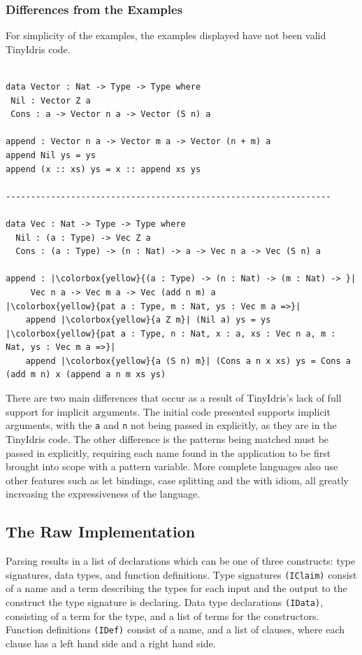 \documentclass[a4paper]{article}
\begin{document}
\clearpage

\subsubsection{Differences from the Examples}
\label{sec:orgcd8bb18}

For simplicity of the examples, the examples displayed have not been 
valid TinyIdris code. 

\begin{center}
\begin{verbatim}

data Vector : Nat -> Type -> Type where
 Nil : Vector Z a
 Cons : a -> Vector n a -> Vector (S n) a

append : Vector n a -> Vector m a -> Vector (n + m) a
append Nil ys = ys
append (x :: xs) ys = x :: append xs ys

-----------------------------------------------------------------

data Vec : Nat -> Type -> Type where
  Nil : (a : Type) -> Vec Z a
  Cons : (a : Type) -> (n : Nat) -> a -> Vec n a -> Vec (S n) a

append : |\colorbox{yellow}{(a : Type) -> (n : Nat) -> (m : Nat) -> }|
	 Vec n a -> Vec m a -> Vec (add n m) a
|\colorbox{yellow}{pat a : Type, m : Nat, ys : Vec m a =>}|
	append |\colorbox{yellow}{a Z m}| (Nil a) ys = ys
|\colorbox{yellow}{pat a : Type, n : Nat, x : a, xs : Vec n a, m : Nat, ys : Vec m a =>}|
	append |\colorbox{yellow}{a (S n) m}| (Cons a n x xs) ys = Cons a (add m n) x (append a n m xs ys)
\end{verbatim}
\end{center}

There are two main differences that occur as a result of TinyIdris's lack of full
support for implicit arguments. The initial code presented supports
implicit arguments, with the \texttt{a} and \texttt{n} not being passed in explicitly,
as they are in the TinyIdris code. The other difference is the patterns
being matched must be passed in explicitly, requiring each name found 
in the application to be first brought into scope with a pattern 
variable. More complete languages also use other features such as let 
bindings, case splitting and the with idiom, all greatly increasing the
expressiveness of the language.

\subsection{The Raw Implementation}
\label{sec:orgbff7c18}
Parsing results in a list of declarations which can be one of three constructs: type signatures, data types, and function definitions.
Type signatures \texttt{(IClaim)} consist of a name and a term describing the types for each input and the output to the construct the type signature is declaring. Data type 
declarations \texttt{(IData)}, consisting of a term for the type, and a list of
terms for the constructors. Function definitions \texttt{(IDef)} consist of a
name, and a list of clauses, where each clause has a left hand side and
a right hand side. 
\end{document}
